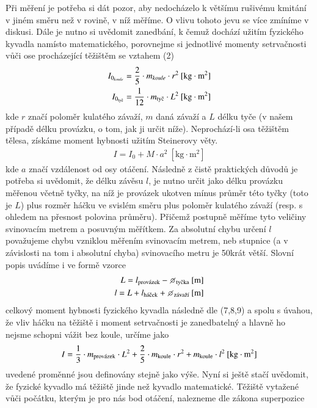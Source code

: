 \documentclass{article}
\begin{document}
\par Při měření je potřeba si dát pozor, aby nedocházelo k většímu rušivému kmitání v jiném směru než v rovině, v níž měříme. O vlivu tohoto jevu se více zmíníme v diskusi. Dále je nutno si uvědomit zanedbání, k čemuž dochází užitím fyzického kyvadla namísto matematického, porovnejme si jednotlivé momenty setrvačnosti vůči ose procházející těžištěm se vztahem (2)
\begin{align}
I_{0_{koule}} = \frac{2}{5} \cdot m_{koule} \cdot r^{2}\: \mathrm{[kg \cdot m^{2}]}\\
I_{0_{\textnormal{tyč}}} = \frac{1}{12} \cdot m_{\textnormal{tyč}} \cdot L^{2}\: \mathrm{[kg \cdot m^{2}]}
\end{align}
kde $r$ značí poloměr kulatého závaží, $m$ daná závaží a $L$ délku tyče (v našem případě délku provázku, o tom, jak ji určit níže).
Neprochází-li osa těžištěm tělesa, získáme moment hybnosti užitím Steinerovy věty.
\begin{align}
I = I_{0} + M \cdot a^{2}\: \mathrm{[kg \cdot m^{2}]}
\end{align}
kde $a$ značí vzdálenost od osy otáčení. Následně z čistě praktických důvodů je potřeba si uvědomit, že délku závěsu $l$, je nutno určit jako délku provázku měřenou včetně tyčky, na níž je provázek ukotven mínus průměr této tyčky (toto je $L$)  plus rozměr háčku ve svislém směru plus poloměr kulatého závaží (resp. s ohledem na přesnost polovina průměru). Přičemž postupně měříme tyto veličiny svinovacím metrem a posuvným měřítkem. Za absolutní chybu určení $l$ považujeme chybu vzniklou měřením svinovacím metrem, neb stupnice (a v závislosti na tom i absolutní chyba) svinovacího metru je 50krát větší. Slovní popis uvádíme i ve formě vzorce
\begin{align}
L = l_{\textnormal{provázek}}- \diameter_{\textnormal{tyčka}} \: \mathrm{[m]} \\
l = L + l_\textnormal{háček} + \diameter_{\textnormal{závaží}}\: \mathrm{[m]}
\end{align}
celkový moment hybnosti fyzického kyvadla následně dle (7,8,9) a spolu s úvahou, že vliv háčku na těžiště i moment setrvačnosti je zanedbatelný a hlavně ho nejsme schopni vážit bez koule, určíme jako
\begin{align}
I = \frac{1}{3}\cdot m_{\textnormal{provázek}}\cdot L^{2} + \frac{2}{5} \cdot m_{\textnormal{koule}} \cdot r^{2} + m_{\textnormal{koule}} \cdot l^{2}\: \mathrm{[kg \cdot m^{2}]}
\end{align} uvedené proměnné jsou definovány stejně jako výše. Nyní si ještě stačí uvědomit, že fyzické kyvadlo má těžiště jinde než kyvadlo matematické. Těžiště vytažené vůči počátku, kterým je pro nás bod otáčení, nalezneme dle zákona superpozice
\end{document}
